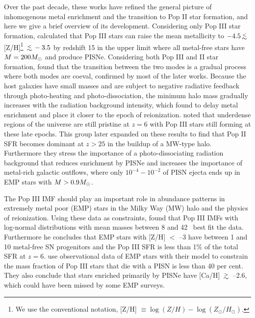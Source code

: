 \documentclass[useAMS,usenatbib]{mn2e}
\begin{document}
Over the past decade, these works have refined the general picture of
inhomogenous metal enrichment and the transition to Pop II star
formation, and here we give a brief overview of its development.
Considering only Pop III star formation, \citeauthor{Yoshida04}
calculated that Pop III stars can raise the mean metallicity to $-4.5
\lsim$ [Z/H]\footnote{We use the conventional notation, [Z/H] $\equiv
  \log(Z/H) - \log(Z_\odot/H_\odot)$.} $\lsim -3.5$ by redshift 15 in
the upper limit where all metal-free stars have $M = 200 \Ms$ and
produce PISNe.  Considering both Pop III and II star formation,
\citeauthor{Scannapieco03} found that the transition between the two
modes is a gradual process where both modes are coeval, confirmed by
most of the later works.  Because the host galaxies have small masses
and are subject to negative radiative feedback through photo-heating
and photo-dissociation, the minimum halo mass gradually increases with
the radiation background intensity, which
\citeauthor{Furlanetto05_Reion} found to delay metal enrichment and
place it closer to the epoch of reionization.  \citeauthor{Trenti09}
noted that underdense regions of the universe are still pristine at
$z=6$ with Pop III stars still forming at these late epochs.  This
group later expanded on these results to find that Pop II SFR becomes
dominant at $z>25$ in the buildup of a MW-type halo.  Furthermore they
stress the importance of a photo-dissociating radiation background
that reduces enrichment by PISNe and increases the importance of
metal-rich galactic outflows, where only $10^{-4} - 10^{-2}$ of PISN
ejecta ends up in EMP stars with $M > 0.9 \Ms$.

The Pop III IMF should play an important role in abundance patterns in
extremely metal poor (EMP) stars in the Milky Way (MW) halo and the
physics of reionization.  Using these data as constraints,
\citeauthor{Tumlinson06} found that Pop III IMFs with log-normal
distributions with mean masses between 8 and 42 \Ms~best fit the data.
Furthermore he concludes that EMP stars with [Z/H] $<$ --3 have
between 1 and 10 metal-free SN progenitors and the Pop III SFR is less
than 1\% of the total SFR at $z=6$.  \citeauthor{Karlsson08} use
observational data of EMP stars with their model to constrain the mass
fraction of Pop III stars that die with a PISN is less than 40 per
cent.  They also conclude that stars enriched primarily by PISNe have
[Ca/H] $\gsim$ --2.6, which could have been missed by some EMP
surveys.

%
\end{document}
